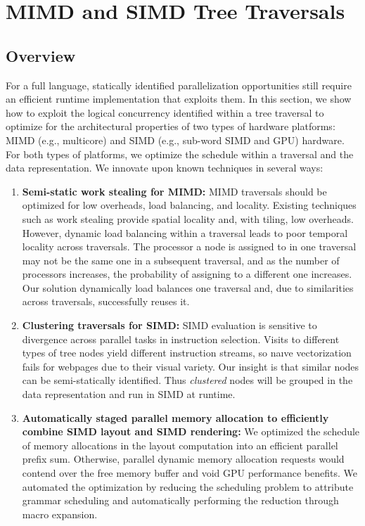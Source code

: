 \chapter{MIMD and SIMD Tree Traversals}
\section{Overview}

For a full language, statically identified parallelization opportunities still require an efficient runtime implementation that exploits them. In this section, we show how to exploit the logical concurrency identified within a tree traversal to optimize for the architectural properties of two types of hardware platforms: MIMD (e.g., multicore) and SIMD (e.g., sub-word SIMD and GPU) hardware. For both types of platforms, we optimize the schedule within a traversal and the data representation. We innovate upon known techniques in several ways:

\begin{enumerate}
\item \textbf{Semi-static work stealing for MIMD:} MIMD traversals should be optimized for low overheads, load balancing, and locality. Existing techniques such as work stealing provide spatial locality and, with tiling, low overheads. However, dynamic load balancing within a traversal leads to poor temporal locality across traversals. The processor a node is assigned to in one traversal may not be the same one in a subsequent traversal, and as the number of processors increases, the probability of assigning to a different one increases. Our solution dynamically load balances one traversal and, due to similarities across traversals, successfully reuses it.
\item \textbf{Clustering traversals for SIMD:}  SIMD evaluation is sensitive to divergence across parallel tasks in instruction selection. Visits to different types of tree nodes yield different instruction streams, so na\i{v}e vectorization fails for webpages due to their visual variety. Our insight is that similar nodes can be semi-statically identified. Thus \emph{clustered} nodes will be grouped in the data representation and run in SIMD at runtime.
\item \textbf{Automatically staged parallel memory allocation to efficiently combine SIMD layout and SIMD rendering:} We optimized the schedule of memory allocations in the layout computation into an efficient parallel prefix sum. Otherwise, parallel dynamic memory allocation requests would contend over the free memory buffer and void GPU performance benefits. We automated the optimization by reducing the scheduling problem to attribute grammar scheduling and automatically performing the reduction through macro expansion.
\end{enumerate}

